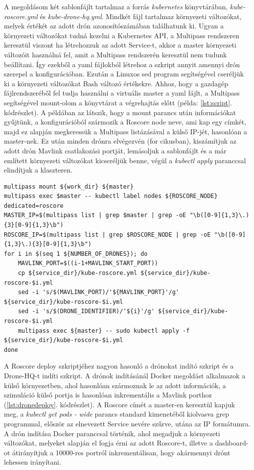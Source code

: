 \noindent
A megoldásom két sablonfájlt tartalmaz a forrás \emph{kubernetes} könyvtárában, \emph{kube-roscore.yml} és \emph{kube-drone-hq.yml}. Mindkét fájl tartalmaz környezeti változókat, melyek értékét az adott drón azonosítószámában találhatunk ki. Ugyan a környezeti változókat tudná kezelni a Kubernetes API, a Multipass rendszeren keresztül viszont ha létrehozzuk az adott Service-t, akkor a master környezeti változóit használná fel, amit a Multipass rendszerén keresztül nem tudunk beállítani. Így ezekből a yaml fájlokból létrehoz a szkript annyit amennyi drón szerepel a konfigurációban. Ezután a Linuxos sed program segítségével cseréljük ki a környezeti változókat Bash változó értékekre. Ahhoz, hogy a gazdagép fájlrendszeréből fel tudja használni a virtuális master a yaml fájlt, a Multipass segítségével mount-olom a könyvtárat a végrehajtás előtt (példa: \ref{lst:script}. kódrészlet). A példában az látszik, hogy a mount parancs után információkat gyűjtünk, a konfigurációból szármozik a Roscore node neve, ami kap egy címkét, majd ez alapján megkeressük a Multipass listázásával a külső IP-jét, hasonlóan a master-nek. Ez után minden drónra elvégezvén (for cikusban), kiszámítjuk az adott drón Mavlink csatlakozási portját, lemásoljuk a sablonfájlt és a már említett környezeti változókat kicseréljük benne, végül a \emph{kubectl apply} paranccsal elindítjuk a klaszteren. \\

\begin{minipage}{\linewidth}
\begin{lstlisting}[caption={Roscore információk összegyűjtése és deploy},label={lst:script}]
multipass mount ${work_dir} ${master}
multipass exec $master -- kubectl label nodes ${ROSCORE_NODE} dedicated=roscore
MASTER_IP=$(multipass list | grep $master | grep -oE "\b([0-9]{1,3}\.){3}[0-9]{1,3}\b")
ROSCORE_IP=$(multipass list | grep $ROSCORE_NODE | grep -oE "\b([0-9]{1,3}\.){3}[0-9]{1,3}\b")
for i in $(seq 1 ${NUMBER_OF_DRONES}); do
	MAVLINK_PORT=$((i-1+MAVLINK_START_PORT))
	cp ${service_dir}/kube-roscore.yml ${service_dir}/kube-roscore-$i.yml
	sed -i 's/$(MAVLINK_PORT)/'${MAVLINK_PORT}'/g' ${service_dir}/kube-roscore-$i.yml
	sed -i 's/$(DRONE_IDENTIFIER)/'${i}'/g' ${service_dir}/kube-roscore-$i.yml
	multipass exec ${master} -- sudo kubectl apply -f ${service_dir}/kube-roscore-$i.yml
done
\end{lstlisting}
\end{minipage}

\noindent
A Roscore deploy szkriptjéhez nagyon hasonló a drónokat indító szkript és a Drone-HQ-t indíti szkript. A drónok indításánál Docker megoldást alkalmazok a külső környezetben, ahol hasonlóan szármoznak le az adott információk, a szimuláció külső portja is hasonlóan inkrementális a Mavlink porthoz (\ref{lst:dronedeploy}. kódrészlet). A Roscore címét a master-en keresztül kapjuk meg, a \emph{kubectl get pods - wide} parancs standard kimenetéből kiolvasva grep programmal, először az elnevezett Service nevére szűrve, utána az IP formátumra. A drón indítása Docker paranccsal történik, ahol megadjuk a környezeti változókat, melyeket alapján el fogja érni az adott Roscore-t, illetve a dashboard-ot átirányítjuk a 10000-res portról inkrementálisan, hogy akármennyi drónt lehessen irányítani.

